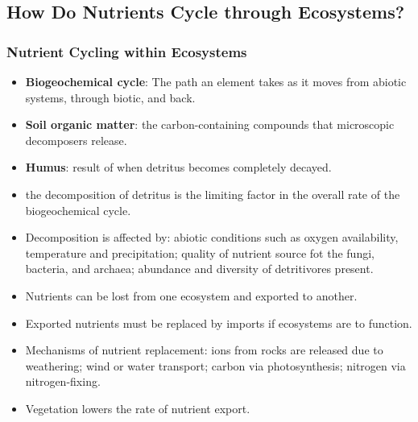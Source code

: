 \documentclass[12pt,a4paper]{article}
\begin{document}
\subsection{How Do Nutrients Cycle through Ecosystems?}
\subsubsection{Nutrient Cycling within Ecosystems}
\begin{itemize}
    \item \textbf{Biogeochemical cycle}: The path an element takes as it moves from abiotic systems, through biotic, and back. 
    \item \textbf{Soil organic matter}: the carbon-containing compounds that microscopic decomposers release.
    \item \textbf{Humus}: result of when detritus becomes completely decayed.
    \item the decomposition of detritus is the limiting factor in the overall rate of the biogeochemical cycle.
    \item Decomposition is affected by: abiotic conditions such as oxygen availability, temperature and precipitation; quality of nutrient source fot the fungi, bacteria, and archaea; abundance and diversity of detritivores present.
    \item Nutrients can be lost from one ecosystem and exported to another.
    \item Exported nutrients must be replaced by imports if ecosystems are to function.
    \item Mechanisms of nutrient replacement: ions from rocks are released due to weathering; wind or water transport; carbon via photosynthesis; nitrogen via nitrogen-fixing.
    \item Vegetation lowers the rate of nutrient export.
\end{itemize}
\end{document}
